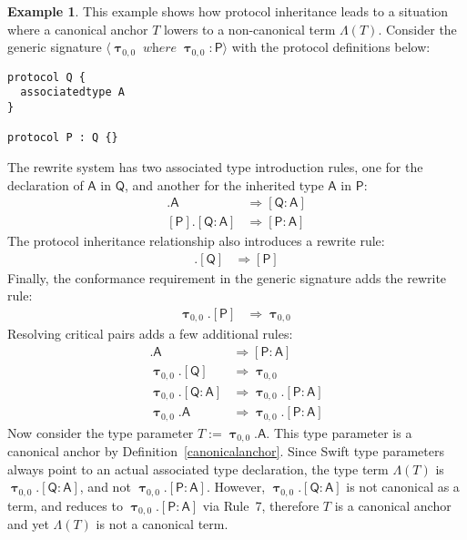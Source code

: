 \documentclass[headsepline,bibliography=totoc]{scrreport}
\newcommand{\namesym}[1]{\mathsf{#1}}
\newcommand{\proto}[1]{\bm{\mathsf{#1}}}
\newcommand{\protosym}[1]{[\proto{#1}]}
\newcommand{\gensig}[2]{\langle #1\;\textit{where}\;#2\rangle}
\newcommand{\genericsym}[2]{\bm{\uptau}_{#1,#2}}
\newcommand{\assocsym}[2]{[\proto{#1}\colon\namesym{#2}]}
\theoremstyle{definition}
\newtheorem{example}{Example}[chapter]
\theoremstyle{definition}
\theoremstyle{definition}
\begin{document}
\begin{example} This example shows how protocol inheritance leads to a situation where a canonical anchor $T$ lowers to a non-canonical term $\Lambda(T)$. Consider the generic signature $\gensig{\genericsym{0}{0}}{\genericsym{0}{0}\colon\proto{P}}$ with the protocol definitions below:
\begin{Verbatim}
protocol Q {
  associatedtype A
}

protocol P : Q {}
\end{Verbatim}
The rewrite system has two associated type introduction rules, one for the declaration of $\namesym{A}$ in $\proto{Q}$, and another for the inherited type $\namesym{A}$ in $\proto{P}$:
\begin{align}
\protosym{Q}.\namesym{A}&\Rightarrow\assocsym{Q}{A}\tag{1}\\
\protosym{P}.\assocsym{Q}{A}&\Rightarrow \assocsym{P}{A}\tag{2}
\end{align}
The protocol inheritance relationship also introduces a rewrite rule:
\begin{align}
\protosym{P}.\protosym{Q}&\Rightarrow\protosym{P}\tag{3}
\end{align}
Finally, the conformance requirement in the generic signature adds the rewrite rule:
\begin{align}
\genericsym{0}{0}.\protosym{P}&\Rightarrow\genericsym{0}{0}\tag{4}
\end{align}
Resolving critical pairs adds a few additional rules:
\begin{align}
\protosym{P}.\namesym{A}&\Rightarrow\assocsym{P}{A}\tag{5}\\
\genericsym{0}{0}.\protosym{Q}&\Rightarrow\genericsym{0}{0}\tag{6}\\
\genericsym{0}{0}.\assocsym{Q}{A}&\Rightarrow\genericsym{0}{0}.\assocsym{P}{A}\tag{7}\\
\genericsym{0}{0}.\namesym{A}&\Rightarrow\genericsym{0}{0}.\assocsym{P}{A}\tag{8}
\end{align}
Now consider the type parameter $T:=\genericsym{0}{0}.\namesym{A}$. This type parameter is a canonical anchor by Definition~\ref{canonicalanchor}. Since Swift type parameters always point to an actual associated type declaration, the type term $\Lambda(T)$ is $\genericsym{0}{0}.\assocsym{Q}{A}$, and not $\genericsym{0}{0}.\assocsym{P}{A}$. However, $\genericsym{0}{0}.\assocsym{Q}{A}$ is not canonical as a term, and reduces to $\genericsym{0}{0}.\assocsym{P}{A}$ via Rule~7, therefore $T$ is a canonical anchor and yet $\Lambda(T)$ is not a canonical term.


\end{example}
\end{document}

